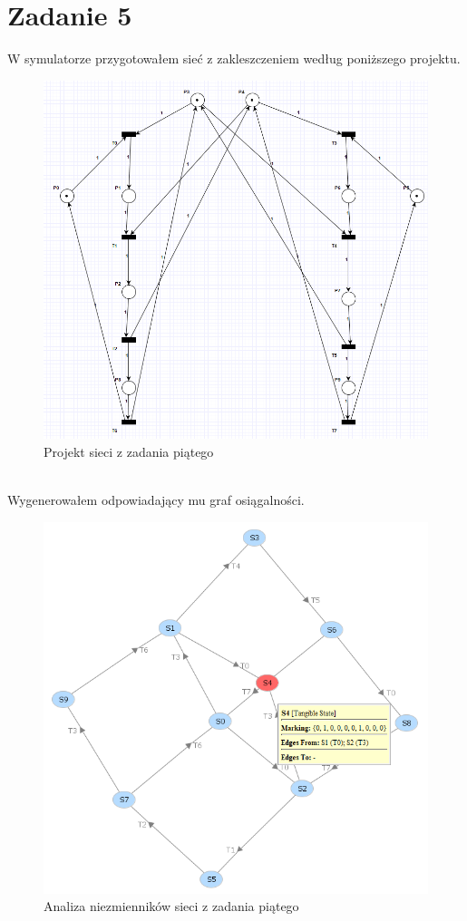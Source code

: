 \documentclass{article}
\begin{document}
    \section{Zadanie 5}
        W symulatorze przygotowałem sieć z zakleszczeniem według poniższego projektu.
        \begin{figure}[h!]
            \centering
            \includegraphics[width=17cm]{lab6/n5.png}
            \caption{Projekt sieci z zadania piątego}
        \end{figure}\\
        \FloatBarrier
        Wygenerowałem odpowiadający mu graf osiągalności. 
        \begin{figure}[h!]
            \centering
            \includegraphics[width=15cm]{lab6/n5_3.png}
            \caption{Analiza niezmienników sieci z zadania piątego}
        \end{figure}\\
\end{document}
